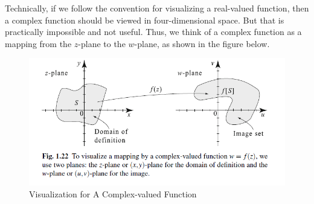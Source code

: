 \documentclass[11pt,reqno,oneside,a4paper]{article}
\begin{document}
Technically, if we follow the convention for visualizing a real-valued function, then a complex function should be viewed in four-dimensional space. But that is practically impossible and not useful. Thus, we think of a complex function as a mapping from the $z$-plane to the $w$-plane, as shown in the figure below. 

\begin{figure}[htp]
	\centering
	\includegraphics[width=0.8\linewidth]{gfx/complex-function-vis.png}
	\caption{Visualization for A Complex-valued Function}
	\label{fig:complex-function-vis}
\end{figure}
\end{document}
